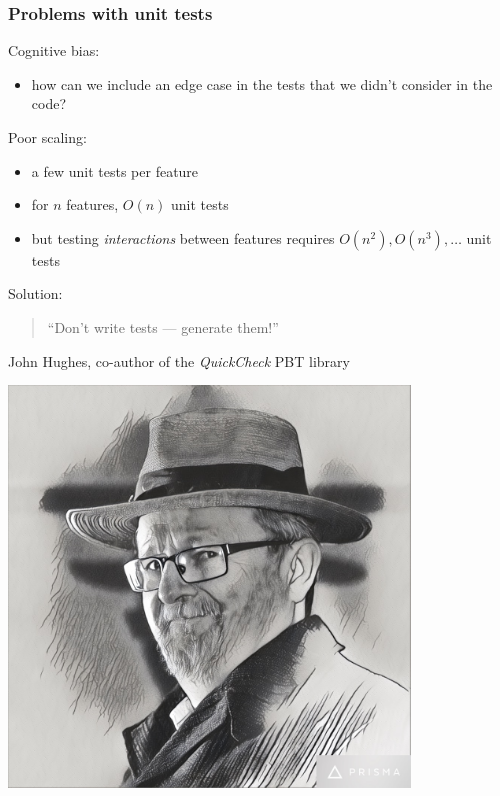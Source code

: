 \documentclass{beamer}
\begin{document}
\begin{frame}[fragile]
  \frametitle{Problems with unit tests}

  Cognitive bias:
  \begin{itemize}
  \item how can we include an edge case in the tests
    that we didn't consider in the code?
  \end{itemize}
  \medskip
  
  Poor scaling:
  \begin{itemize}
  \item a few unit tests per feature
  \item for $n$ features, $O(n)$ unit tests
  \item but testing \emph{interactions} between features requires $O(n^2),
    O(n^3), \ldots$ unit tests
  \end{itemize}
  \pause
  \bigskip
  

    \begin{minipage}{0.7\textwidth}
      Solution:
      \medskip
      
      \begin{quote}
        ``Don't write tests 
        --- generate them!''
      \end{quote}
      John Hughes, co-author of the \emph{QuickCheck}
      PBT library
    \end{minipage}
    \begin{minipage}{0.25\textwidth}
      \hfill
      \includegraphics[width=0.8\textwidth]{images/john-hughes}
    \end{minipage}
  
\end{frame}
\end{document}
